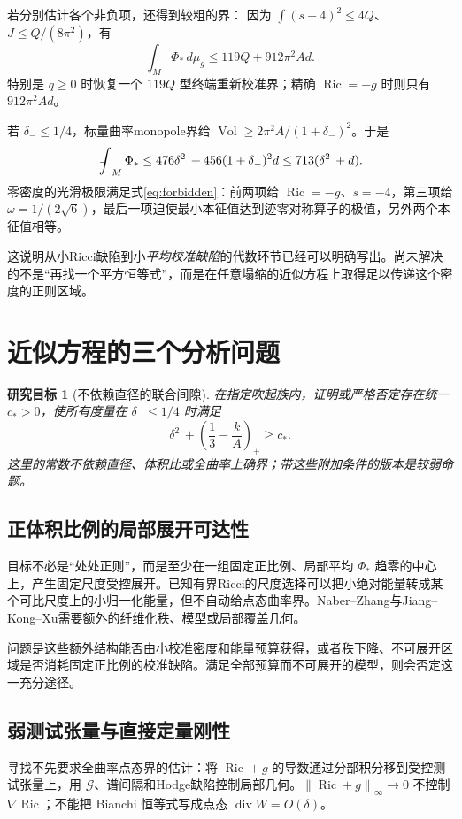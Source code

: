 \documentclass[UTF8,a4paper,11pt,fontset=fandol]{ctexart}
\numberwithin{equation}{section}
\newtheorem{target}[theorem]{研究目标}
\theoremstyle{definition}
\newcommand{\Ric}{\operatorname{Ric}}
\newcommand{\Vol}{\operatorname{Vol}}
\newcommand{\dd}{\,d\mu_g}
\newcommand{\fint}{\mathop{\rlap{\,\raisebox{0.1ex}{\tiny$-$}}\int}\nolimits}
\newcommand{\norm}[1]{\left\lVert#1\right\rVert}
\begin{document}
若分别估计各个非负项，还得到较粗的界：
因为 $\int(s+4)^2\le4Q$、$J\le Q/(8\pi^2)$，有
\begin{equation}\label{eq:119}
\boxed{\int_M\Phi_*\dd\le119Q+912\pi^2 A d.}
\end{equation}
特别是 $q\ge0$ 时恢复一个 $119Q$ 型终端重新校准界；精确 $\Ric=-g$ 时则只有 $912\pi^2Ad$。

若 $\delta_-\le1/4$，标量曲率monopole界给 $\Vol\ge2\pi^2A/(1+\delta_-)^2$。于是
\begin{equation}\label{eq:meanPhi}
\fint_M\Phi_*\le476\delta_-^2+456(1+\delta_-)^2d
\le713(\delta_-^2+d).
\end{equation}
零密度的光滑极限满足式\eqref{eq:forbidden}：前两项给 $\Ric=-g$、$s=-4$，第三项给 $\omega=1/(2\sqrt6)$，最后一项迫使最小本征值达到迹零对称算子的极值，另外两个本征值相等。

这说明从小Ricci缺陷到小\emph{平均校准缺陷}的代数环节已经可以明确写出。尚未解决的不是“再找一个平方恒等式”，而是在任意塌缩的近似方程上取得足以传递这个密度的正则区域。

\section{近似方程的三个分析问题}
\begin{target}[不依赖直径的联合间隙]\label{tar:joint}
在指定吹起族内，证明或严格否定存在统一 $c_*>0$，使所有度量在 $\delta_-\le1/4$ 时满足
\begin{equation}\label{eq:joint}
\delta_-^2+\left(\frac13-\frac{k}{A}\right)_+\ge c_*.
\end{equation}
这里的常数不依赖直径、体积比或全曲率上确界；带这些附加条件的版本是较弱命题。
\end{target}

\subsection{正体积比例的局部展开可达性}
目标不必是“处处正则”，而是至少在一组固定正比例、局部平均 $\Phi_*$ 趋零的中心上，产生固定尺度受控展开。已知有界Ricci的尺度选择\cite[Theorem 3.4]{GJ2017}可以把小绝对能量转成某个可比尺度上的小归一化能量，但不自动给点态曲率界。Naber--Zhang与Jiang--Kong--Xu需要额外的纤维化秩、模型或局部覆盖几何\cite{NZ,JKX}。

问题是这些额外结构能否由小校准密度和能量预算获得，或者秩下降、不可展开区域是否消耗固定正比例的校准缺陷。满足全部预算而不可展开的模型，则会否定这一充分途径。

\subsection{弱测试张量与直接定量刚性}
寻找不先要求全曲率点态界的估计：将 $\Ric+g$ 的导数通过分部积分移到受控测试张量上，用 $\mathcal G$、谱间隔和Hodge缺陷控制局部几何。$\norm{\Ric+g}_\infty\to0$ 不控制 $\nabla\Ric$；不能把 Bianchi 恒等式写成点态 $\operatorname{div}W=O(\delta)$。
\end{document}
